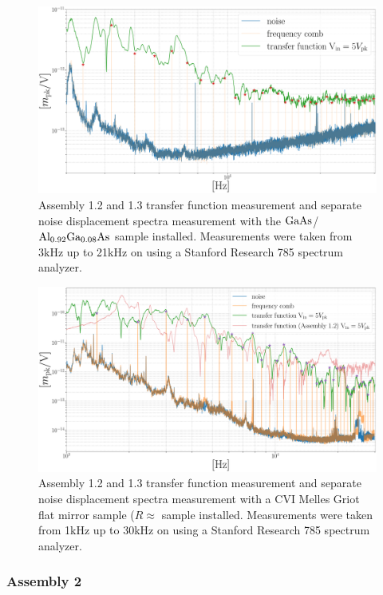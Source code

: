 \begin{figure}[H]
    \includegraphics[width=\textwidth]{figs/ALGAAS/results_figs/assembly1/1_2_algaas_tfwcmb.pdf}
    \caption{Assembly 1.2 and 1.3 transfer function measurement and separate noise displacement spectra measurement with the $\mathrm{GaAs}$/$\mathrm{Al_{0.92}Ga_{0.08}As}$ sample installed. Measurements were taken from 3kHz up to 21kHz on using a Stanford Research 785 spectrum analyzer.}
    \label{fig:assembly12and13displacementspectraalgaas}
\end{figure}

\begin{figure}[H]
    \includegraphics[width=\textwidth]{figs/ALGAAS/results_figs/assembly1/1_2_cvi_compare_tfwcmb.pdf}
    \caption{Assembly 1.2 and 1.3 transfer function measurement and separate noise displacement spectra measurement with a CVI Melles Griot flat mirror sample ($R \approx $ sample installed. Measurements were taken from 1kHz up to 30kHz on using a Stanford Research 785 spectrum analyzer.}
    \label{fig:assembly12and13displacementspectracvi}
\end{figure}

\subsubsection{Assembly 2}

